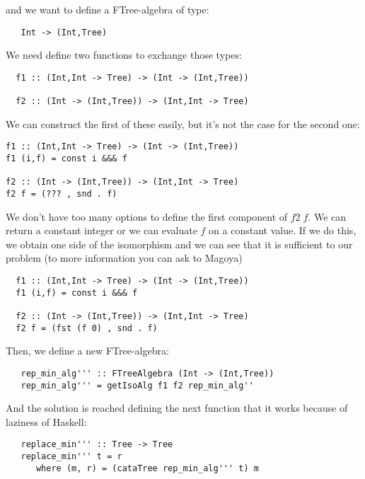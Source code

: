 \documentclass[a4paper,10pt]{article}
\begin{document}
\noindent and we want to define a FTree-algebra of type:

\begin{lstlisting}
   Int -> (Int,Tree)
\end{lstlisting} 

We need define two functions to exchange those types:
  
  \begin{lstlisting}
  f1 :: (Int,Int -> Tree) -> (Int -> (Int,Tree))
    
  f2 :: (Int -> (Int,Tree)) -> (Int,Int -> Tree)
  \end{lstlisting}

We can construct the first of these easily, but it's not the case for the second one:

\begin{lstlisting}
f1 :: (Int,Int -> Tree) -> (Int -> (Int,Tree))
f1 (i,f) = const i &&& f

f2 :: (Int -> (Int,Tree)) -> (Int,Int -> Tree)
f2 f = (??? , snd . f)
\end{lstlisting}

We don't have too many options to define the first component of $f2\;f$. We can
return a constant integer or we can evaluate $f$ on a constant value. If we do this,
we obtain one side of the isomorphism and we can see that it is sufficient to our problem
(to more information you can ask to Magoya)

  \begin{lstlisting}
  f1 :: (Int,Int -> Tree) -> (Int -> (Int,Tree))
  f1 (i,f) = const i &&& f

  f2 :: (Int -> (Int,Tree)) -> (Int,Int -> Tree)
  f2 f = (fst (f 0) , snd . f)
  \end{lstlisting}

  Then, we define a new FTree-algebra:
  
  \begin{lstlisting}
   rep_min_alg''' :: FTreeAlgebra (Int -> (Int,Tree))
   rep_min_alg''' = getIsoAlg f1 f2 rep_min_alg''
  \end{lstlisting}

  And the solution is reached defining the next function that it works because of laziness of Haskell:
  
  \begin{lstlisting}
   replace_min''' :: Tree -> Tree
   replace_min''' t = r
      where (m, r) = (cataTree rep_min_alg''' t) m
  \end{lstlisting}
\end{document}
